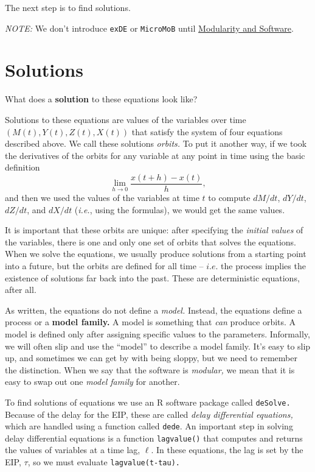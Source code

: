 \documentclass[
]{book}
\begin{document}
The next step is to find solutions.

\emph{NOTE:} We don't introduce \texttt{exDE} or \texttt{MicroMoB} until \protect\hyperlink{modularity-and-software}{Modularity and Software}.

\hypertarget{solutions}{%
\section{Solutions}\label{solutions}}

What does a \textbf{solution} to these equations look like?

Solutions to these equations are values of the variables over time \(\left( M(t), Y(t), Z(t), X(t) \right)\) that satisfy the system of four equations described above. We call these solutions \emph{orbits.} To put it another way, if we took the derivatives of the orbits for any variable at any point in time using the basic definition \[\lim_{h\rightarrow 0} \frac{x(t+h)-x(t)}{h},\] and then we used the values of the variables at time \(t\) to compute \(dM/dt\), \(dY/dt\), \(dZ/dt\), and \(dX/dt\) (\emph{i.e.}, using the formulas), we would get the same values.

It is important that these orbits are unique: after specifying the \emph{initial values} of the variables, there is one and only one set of orbits that solves the equations. When we solve the equations, we usually produce solutions from a starting point into a future, but the orbits are defined for all time -- \(i.e.\) the process implies the existence of solutions far back into the past. These are deterministic equations, after all.

As written, the equations do not define a \emph{model.} Instead, the equations define a process or a \textbf{model family.} A model is something that \emph{can} produce orbits. A model is defined only after assigning specific values to the parameters. Informally, we will often slip and use the ``model'' to describe a model family. It's easy to slip up, and sometimes we can get by with being sloppy, but we need to remember the distinction. When we say that the software is \emph{modular,} we mean that it is easy to swap out one \emph{model family} for another.

To find solutions of equations we use an R software package called \texttt{deSolve.} Because of the delay for the EIP, these are called \emph{delay differential equations,} which are handled using a function called \texttt{dede}. An important step in solving delay differential equations is a function \texttt{lagvalue()} that computes and returns the values of variables at a time lag, \(\ell\). In these equations, the lag is set by the EIP, \(\tau\), so we must evaluate
\texttt{lagvalue(t-tau).}
\end{document}
